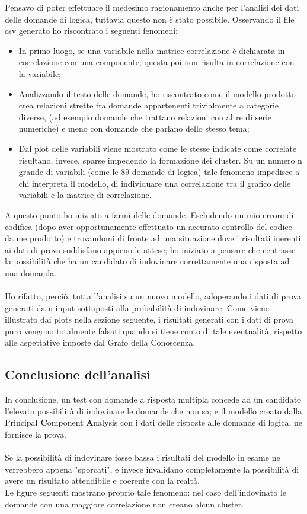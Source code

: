 Pensavo di poter effettuare il medesimo ragionamento anche per l'analisi dei dati delle domande di logica, tuttavia questo non \`e stato possibile. Osservando il file csv generato ho riscontrato i seguenti fenomeni:
\begin{itemize}
\item In primo luogo, se una variabile nella matrice correlazione \`e dichiarata in correlazione con una componente, questa poi non risulta in correlazione con la variabile;
\item Analizzando il testo delle domande, ho riscontrato come il modello prodotto crea relazioni strette fra domande appartenenti trivialmente a categorie diverse, (ad esempio domande che trattano relazioni con altre di serie numeriche) e meno con domande che parlano dello stesso tema;
\item Dal plot delle variabili viene mostrato come le stesse indicate come correlate risultano, invece, sparse impedendo la formazione dei cluster. Su un numero n grande di variabili (come le 89 domande di logica) tale fenomeno  impedisce a chi interpreta il modello, di individuare una correlazione tra il grafico delle variabili e la matrice di correlazione.
\end{itemize}
A questo punto ho iniziato a farmi delle domande. Escludendo un mio errore di codifica (dopo aver opportunamente effettuato un accurato controllo del codice da me prodotto) e trovandomi di fronte ad una situazione dove i risultati inerenti ai dati di prova soddisfano appieno le attese; ho iniziato a pensare che centrasse la possibilit\`a che ha un candidato di indovinare correttamente una risposta ad una domanda.\\\\
Ho rifatto, perci\`o, tutta l'analisi su un nuovo modello, adoperando i dati di prova generati da n input sottoposti alla probabilit\`a di indovinare. Come viene illustrato dai plots nella sezione seguente, i risultati generati con i dati di prova puro vengono totalmente falsati quando si tiene conto di tale eventualit\`a, rispetto alle aspettative imposte dal Grafo della Conoscenza. 

\subsection{Conclusione dell'analisi}
\label{Conclusione dell'analisi}
In conclusione, un test con domande a risposta multipla concede ad un candidato l'elevata possibilit\`a di indovinare le domande che non sa; e il modello creato dalla {P}rincipal \textbf{C}omponent \textbf{A}nalysis con i dati delle risposte alle domande di logica, ne fornisce la prova.\\\\ Se la possibilit\`a di indovinare fosse bassa i risultati del modello in esame ne verrebbero appena "sporcati", e invece invalidano completamente la possibilit\`a di avere un risultato attendibile e coerente con la realt\`a.\\
Le figure seguenti mostrano proprio tale fenomeno: nel caso dell'indovinato le domande con una maggiore correlazione non creano alcun cluster.

